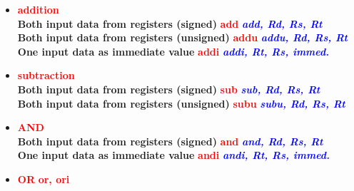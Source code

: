 \documentclass[
  14pt,
  a4paper,
  DIV=11,
  numbers=noendperiod,
  headinclude=true,
  footinclude=true]{scrreprt}
\providecommand{\tightlist}{%
  \setlength{\itemsep}{0pt}\setlength{\parskip}{0pt}}\usepackage{longtable,booktabs,array}
\begin{document}
\begin{tcolorbox}[colback=boxbodycol2, colframe=boxheadcol2, title=\underline{\textbf{ALU operations}}, coltitle=boxtitlecol2, colbacktitle=boxheadcol2]

\begin{itemize}
\tightlist
\item
  \textcolor{red}{\textbf{addition}}\\
  \textbf{Both input data from registers (signed)}
  \textcolor{red}{\textbf{add}} \textcolor{blue}{\textbf{\emph{add, Rd,
  Rs, Rt}}}\\
  \textbf{Both input data from registers (unsigned)}
  \textcolor{red}{\textbf{addu}} \textcolor{blue}{\textbf{\emph{addu,
  Rd, Rs, Rt}}}\\
  \textbf{One input data as immediate value}
  \textcolor{red}{\textbf{addi}} \textcolor{blue}{\textbf{\emph{addi,
  Rt, Rs, immed.}}}
\item
  \textcolor{red}{\textbf{subtraction}}\\
  \textbf{Both input data from registers (signed)}
  \textcolor{red}{\textbf{sub}} \textcolor{blue}{\textbf{\emph{sub, Rd,
  Rs, Rt}}}\\
  \textbf{Both input data from registers (unsigned)}
  \textcolor{red}{\textbf{subu}} \textcolor{blue}{\textbf{\emph{subu,
  Rd, Rs, Rt}}}
\item
  \textcolor{red}{\textbf{AND}}\\
  \textbf{Both input data from registers (signed)}
  \textcolor{red}{\textbf{and}} \textcolor{blue}{\textbf{\emph{and, Rd,
  Rs, Rt}}}\\
  \textbf{One input data as immediate value}
  \textcolor{red}{\textbf{andi}} \textcolor{blue}{\textbf{\emph{andi,
  Rt, Rs, immed.}}}
\item
  \textcolor{red}{\textbf{OR}} \textcolor{red}{\textbf{or, ori}}
\end{itemize}

\end{tcolorbox}
\end{document}
